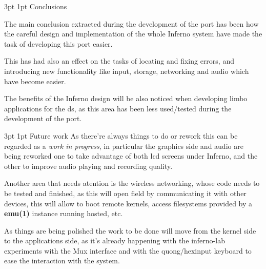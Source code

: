 \documentclass[11pt]{p9article}
\makeatletter
\renewcommand\section{\@startsection {section}{1}{\z@} {3pt} {1pt}
{\normalfont\normalsize\bfseries}}
\makeatother
\begin{document}
\section{Conclusions}

The main conclusion extracted during the development of the port has been
how the careful design and implementation of the whole Inferno system
have made the task of developing this port easier.

This has had also an effect on the tasks of locating and fixing errors,
and introducing new functionality like input, storage, networking and audio
which have become easier.

The benefits of the Inferno design \cite{inferno-os} will be also noticed
when developing limbo applications for the ds,
as this area has been less used/tested during the development of the port.

\section{Future work}
As there're always things to do or rework
this can be regarded as a \emph{work in progress},
in particular the graphics side and audio are being reworked
one to take advantage of both lcd screens under Inferno,
and the other to improve audio playing and recording quality.

Another area that needs atention is the wireless networking,
whose code needs to be tested and finished,
as this will open field by communicating it with other devices,
this will allow to boot remote kernels, access filesystems provided by a \textbf{emu(1)} instance running hosted, etc.
	
As things are being polished the work to be done will move from the kernel side to the applications side,
as it's already happening with the inferno-lab \cite{caerwyn-ipn} experiments with the Mux interface and
with the quong/hexinput keyboard to ease the interaction with the system.
	
\newpage
\end{document}
